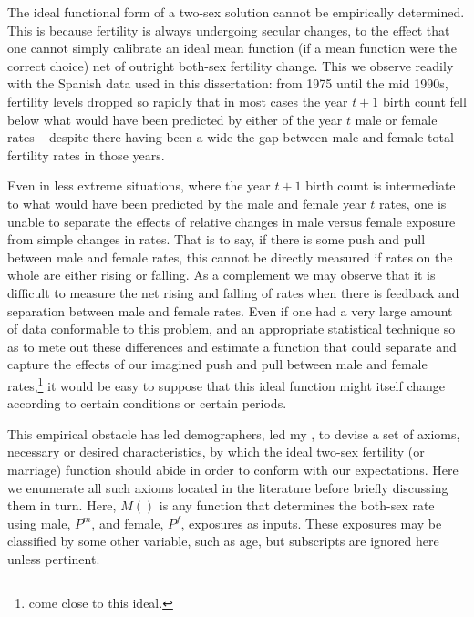  \FloatBarrier
 \label{sec:axioms}
The ideal functional form of a two-sex solution
cannot be empirically determined. This is
because fertility is always undergoing secular changes, to the effect that
one cannot simply calibrate an ideal mean function (if a mean function were the
correct choice) net of outright both-sex fertility change. This we observe
readily with the Spanish data used in this dissertation: from 1975 until the mid
1990s, fertility levels dropped so rapidly that in most cases the year $t+1$ birth count fell below what would have been predicted by either of the
year $t$ male or female rates -- despite there having been a wide the gap
between male and female total fertility rates in those years. 

Even in less
extreme situations, where the year $t+1$ birth count is intermediate to what
would have been predicted by the male and female year $t$ rates, one is unable to
separate the effects of relative changes in male versus female exposure from
simple changes in rates. That is to say, if there is some push and pull between
male and female rates, this cannot be directly measured if rates on the whole
are either rising or falling. As a complement we may observe that it is
difficult to measure the net rising and falling of rates when there is feedback and separation between male and female
rates. Even if one had a very large amount of data conformable to this problem,
and an appropriate statistical technique so as to mete out these differences 
and estimate a function that could separate and capture the effects of our
imagined push and pull between male and female
rates,\footnote{\citet{alho2000competing} come close to this ideal.} it would be
easy to suppose that this ideal function
might itself change according to certain conditions or certain periods.

This empirical obstacle has led demographers, led my
\citet{mcfarland1972comparison}, to devise a set of axioms, necessary or desired characteristics, by which the ideal two-sex fertility
(or marriage) function should abide in order to conform with our
expectations. Here we enumerate all such axioms located in the literature 
before briefly discussing them in turn. Here, $M()$ is any function that
determines the both-sex rate using male, $P^m$, and female, $P^f$, exposures as
inputs. These exposures may be classified by some other variable, such as age, but
subscripts are ignored here unless pertinent.

